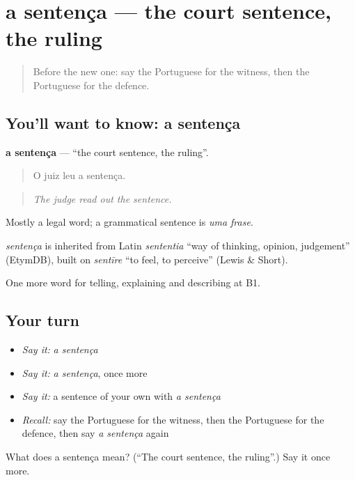 \section[a sentença]{a sentença — the court sentence, the ruling}

\label{lesson:PT-C387-sentenca}



\begin{quote}
Before the new one: say the Portuguese for the witness, then the Portuguese for the defence.
\end{quote}

\subsection*{You'll want to know: a sentença}
\textbf{a sentença} — \textquotedblleft{}the court sentence, the ruling\textquotedblright{}.

\begin{quote}
O juiz leu a sentença.
\end{quote}

\begin{quote}
\emph{The judge read out the sentence.}
\end{quote}

Mostly a legal word; a grammatical sentence is \emph{uma frase}.

\begin{cousinweb}
\emph{sentença} is inherited from Latin \emph{sententia} \textquotedblleft{}way of thinking, opinion, judgement\textquotedblright{} (EtymDB), built on \emph{sentīre} \textquotedblleft{}to feel, to perceive\textquotedblright{} (Lewis \& Short).
\end{cousinweb}

\begin{grammarlens}[title={What you've built}]
One more word for telling, explaining and describing at B1.
\end{grammarlens}

\subsection*{Your turn}
\begin{itemize}
\raggedright
  \item \emph{Say it:} \emph{a sentença}
  \item \emph{Say it:} \emph{a sentença}, once more
  \item \emph{Say it:} a sentence of your own with \emph{a sentença}
  \item \emph{Recall:} say the Portuguese for the witness, then the Portuguese for the defence, then say \emph{a sentença} again
\end{itemize}

\begin{tcolorbox}[breakable,colback=teal!4,colframe=teal!35!black,title={Before you move on}]
What does a sentença mean? (\textquotedblleft{}The court sentence, the ruling\textquotedblright{}.) Say it once more.
\end{tcolorbox}
